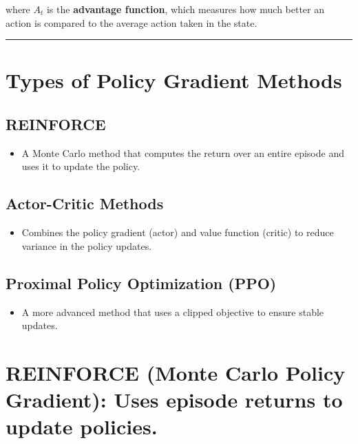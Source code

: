 \documentclass[
]{book}
\providecommand{\tightlist}{%
  \setlength{\itemsep}{0pt}\setlength{\parskip}{0pt}}
\begin{document}
where \(A_t\) is the \textbf{advantage function}, which measures how much better an action is compared to the average action taken in the state.

\begin{center}\rule{0.5\linewidth}{0.5pt}\end{center}

\section{Types of Policy Gradient Methods}\label{types-of-policy-gradient-methods}

\subsection{\texorpdfstring{\textbf{REINFORCE}}{REINFORCE}}\label{reinforce}

\begin{itemize}
\tightlist
\item
  A Monte Carlo method that computes the return over an entire episode and uses it to update the policy.
\end{itemize}

\subsection{\texorpdfstring{\textbf{Actor-Critic Methods}}{Actor-Critic Methods}}\label{actor-critic-methods}

\begin{itemize}
\tightlist
\item
  Combines the policy gradient (actor) and value function (critic) to reduce variance in the policy updates.
\end{itemize}

\subsection{\texorpdfstring{\textbf{Proximal Policy Optimization (PPO)}}{Proximal Policy Optimization (PPO)}}\label{proximal-policy-optimization-ppo}

\begin{itemize}
\tightlist
\item
  A more advanced method that uses a clipped objective to ensure stable updates.
\end{itemize}

\section{\texorpdfstring{\textbf{REINFORCE (Monte Carlo Policy Gradient)}: Uses episode returns to update policies.}{REINFORCE (Monte Carlo Policy Gradient): Uses episode returns to update policies.}}\label{reinforce-monte-carlo-policy-gradient-uses-episode-returns-to-update-policies.}
\end{document}
